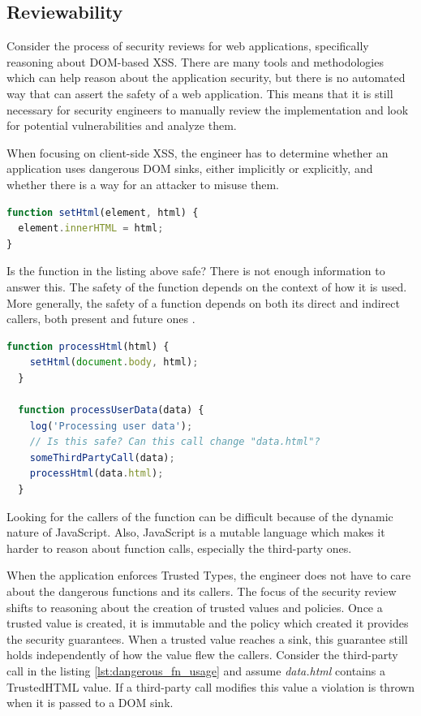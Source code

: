 \subsection{Reviewability}

Consider the process of security reviews for web applications, specifically reasoning about
DOM-based XSS. There are many tools and methodologies which can help reason about the application
security, but there is no automated way that can assert the safety of a web application. This means
that it is still necessary for security engineers to manually review the implementation and look for
potential vulnerabilities and analyze them.

When focusing on client-side XSS, the engineer has to determine whether an application uses
dangerous DOM sinks, either implicitly or explicitly, and whether there is a way for an attacker to
misuse them.

\bigskip
\begin{lstlisting}[language=JavaScript, caption=Possibly dangerous function]
function setHtml(element, html) {
  element.innerHTML = html;
}
\end{lstlisting}

Is the function in the listing above safe? There is not enough information to answer this. The
safety of the function depends on the context of how it is used. More generally, the safety of a
function depends on both its direct and indirect callers, both present and future ones
\cite{tt_design_history}.

\bigskip
\begin{lstlisting}[language=JavaScript, caption=Usage of the possibly dangerous function, label={lst:dangerous_fn_usage}]
  function processHtml(html) {
    setHtml(document.body, html);
  }

  function processUserData(data) {
    log('Processing user data');
    // Is this safe? Can this call change "data.html"?
    someThirdPartyCall(data);
    processHtml(data.html);
  }
\end{lstlisting}

Looking for the callers of the function can be difficult because of the dynamic nature of
JavaScript. Also, JavaScript is a mutable language which makes it harder to reason about function
calls, especially the third-party ones.

When the application enforces Trusted Types, the engineer does not have to care about the dangerous
functions and its callers. The focus of the security review shifts to reasoning about the creation
of trusted values and policies. Once a trusted value is created, it is immutable and the policy
which created it provides the security guarantees. When a trusted value reaches a sink, this
guarantee still holds independently of how the value flew the callers. Consider the third-party call
in the listing \ref{lst:dangerous_fn_usage} and assume \emph{data.html} contains a TrustedHTML
value. If a third-party call modifies this value a violation is thrown when it is passed to a DOM
sink.

